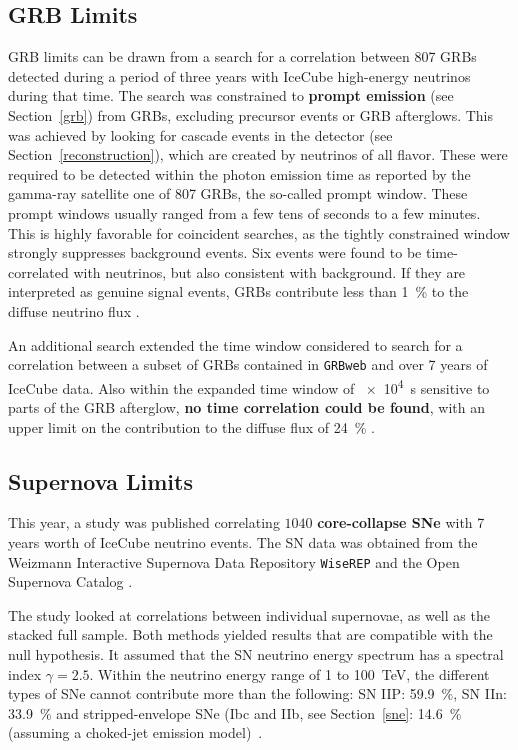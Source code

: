 \subsection{GRB Limits}
GRB limits can be drawn from a search for a correlation between 807 GRBs detected during a period of three years with IceCube high-energy neutrinos during that time. The search was constrained to \textbf{prompt emission} (see Section~\ref{grb}) from GRBs, excluding precursor events or GRB afterglows. This was achieved by looking for cascade events in the detector (see Section~\ref{reconstruction}), which are created by neutrinos of all flavor. These were required to be detected within the photon emission time as reported by the gamma-ray satellite one of 807 GRBs, the so-called prompt window. These prompt windows usually ranged from a few tens of seconds to a few minutes. This is highly favorable for coincident searches, as the tightly constrained window strongly suppresses background events. Six events were found to be time-correlated with neutrinos, but also consistent with background. If they are interpreted as genuine signal events, GRBs contribute less than \SI{1}{\percent} to the diffuse neutrino flux .

An additional search extended the time window considered to search for a correlation between a subset of GRBs contained in \texttt{GRBweb} and over 7 years of IceCube data. Also within the expanded time window of \SI{e4}{s} sensitive to parts of the GRB afterglow, \textbf{no time correlation could be found}, with an upper limit on the contribution to the diffuse flux of \SI{24}{\percent} .

\subsection{Supernova Limits}
This year, a study  was published correlating $1040$ \textbf{core-collapse SNe} with 7 years worth of IceCube neutrino events. The SN data was obtained from the Weizmann Interactive Supernova Data Repository \texttt{WiseREP}  and the Open Supernova Catalog .

The study looked at correlations between individual supernovae, as well as the stacked full sample. Both methods yielded results that are compatible with the null hypothesis. It assumed that the SN neutrino energy spectrum has a spectral index $\gamma=2.5$. Within the neutrino energy range of 1 to \SI{100}{\tera\eV}, the different types of SNe cannot contribute more than the following: SN IIP: \SI{59.9}{\percent}, SN IIn: \SI{33.9}{\percent} and stripped-envelope SNe (Ibc and IIb, see Section~\ref{sne}: \SI{14.6}{\percent} (assuming a choked-jet emission model)~\cite{Necker2023}.


